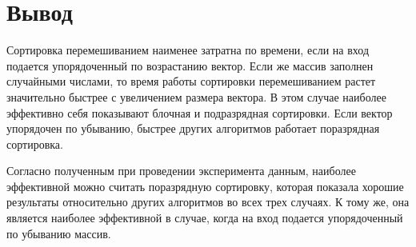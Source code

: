 \section*{Вывод}

Сортировка перемешиванием наименее затратна по времени, если на вход подается упорядоченный по возрастанию вектор. 
Если же массив заполнен случайными числами, то время работы сортировки перемешиванием растет значительно быстрее с увеличением размера вектора. 
В этом случае наиболее эффективно себя показывают блочная и подразрядная сортировки. Если вектор упорядочен по убыванию, быстрее других алгоритмов работает поразрядная сортировка.

Согласно полученным при проведении эксперимента данным, наиболее эффективной можно считать поразрядную сортировку, которая показала хорошие результаты относительно других алгоритмов во всех трех случаях. 
К тому же, она является наиболее эффективной в случае, когда на вход подается упорядоченный по убыванию массив.
